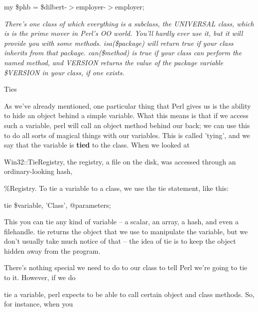 \documentclass[a4paper,11pt]{book}
\begin{document}
\noindent 

\noindent 

\noindent my \$phb = \$dilbert-$>$employer-$>$employer;

\noindent 

\noindent 

\noindent \textit{There's one class of which everything is a subclass, the UNIVERSAL class, which is is the prime mover in Perl's OO world. You'll hardly ever use it, but it will provide you with some methods. isa(\$package) will return true if your class inherits from that package. can(\$method) is true if your class can perform the named method, and VERSION returns the value of the package variable \$VERSION in your class, if one exists.}

\noindent 

\noindent 

\noindent Ties

\noindent 

\noindent As we've already mentioned, one particular thing that Perl gives us is the ability to hide an object behind a simple variable. What this means is that if we access such a variable, perl will call an object method behind our back; we can use this to do all sorts of magical things with our variables. This is called 'tying', and we say that the variable is \textbf{tied }to the class. When we looked at

\noindent Win32::TieRegistry, the registry, a file on the disk, was accessed through an ordinary-looking hash,

\noindent \%Registry. To tie a variable to a class, we use the tie statement, like this:

\noindent 

\noindent tie \$variable, 'Class', @parameters;

\noindent 

\noindent This you can tie any kind of variable -- a scalar, an array, a hash, and even a filehandle. tie returns the object that we use to manipulate the variable, but we don't usually take much notice of that -- the idea of tie is to keep the object hidden away from the program.

\noindent 

\noindent There's nothing special we need to do to our class to tell Perl we're going to tie to it. However, if we do

\noindent tie a variable, perl expects to be able to call certain object and class methods. So, for instance, when you
\end{document}
